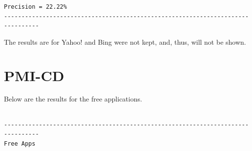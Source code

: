 \documentclass[11pt]{report} %
\begin{document}
\begin{verbatim}
Precision = 22.22%
--------------------------------------------------------------------------------

\end{verbatim}

The results are for Yahoo! and Bing were not kept, and, thus, will not be shown.

	\section{PMI-CD}

Below are the results for the free applications.

\begin{verbatim}

--------------------------------------------------------------------------------
Free Apps


\end{verbatim}
\end{document}
